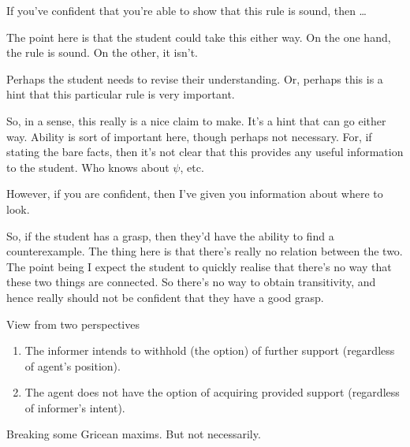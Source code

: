 \documentclass[10pt]{article}
\begin{document}
\begin{note}
  If you've confident that you're able to show that this rule is sound, then \dots

  The point here is that the student could take this either way.
  On the one hand, the rule is sound.
  On the other, it isn't.

  Perhaps the student needs to revise their understanding.
  Or, perhaps this is a hint that this particular rule is very important.

  So, in a sense, this really is a nice claim to make.
  It's a hint that can go either way.
  Ability is sort of important here, though perhaps not necessary.
  For, if stating the bare facts, then it's not clear that this provides any useful information to the student.
  Who knows about \(\psi\), etc.

  However, if you are confident, then I've given you information about where to look.


  So, if the student has a grasp, then they'd have the ability to find a counterexample.
  The thing here is that there's really no relation between the two.
  The point being I expect the student to quickly realise that there's no way that these two things are connected.
  So there's no way to obtain transitivity, and hence really should not be confident that they have a good grasp.
\end{note}

View from two perspectives
\begin{enumerate}
\item The informer intends to withhold (the option) of further support (regardless of agent's position).
\item The agent does not have the option of acquiring provided support (regardless of informer's intent).
\end{enumerate}

Breaking some Gricean maxims.
But not necessarily.



\end{document}
